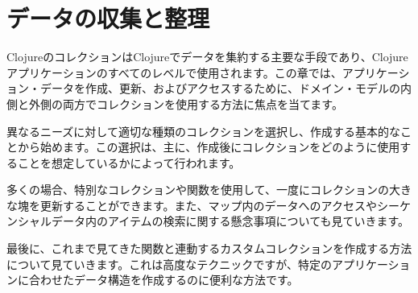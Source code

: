 \chapter{データの収集と整理}

ClojureのコレクションはClojureでデータを集約する主要な手段であり、Clojureアプリケーションのすべてのレベルで使用されます。この章では、アプリケーション・データを作成、更新、およびアクセスするために、ドメイン・モデルの内側と外側の両方でコレクションを使用する方法に焦点を当てます。

異なるニーズに対して適切な種類のコレクションを選択し、作成する基本的なことから始めます。この選択は、主に、作成後にコレクションをどのように使用することを想定しているかによって行われます。

多くの場合、特別なコレクションや関数を使用して、一度にコレクションの大きな塊を更新することができます。また、マップ内のデータへのアクセスやシーケンシャルデータ内のアイテムの検索に関する懸念事項についても見ていきます。

最後に、これまで見てきた関数と連動するカスタムコレクションを作成する方法について見ていきます。これは高度なテクニックですが、特定のアプリケーションに合わせたデータ構造を作成するのに便利な方法です。



     
    
         